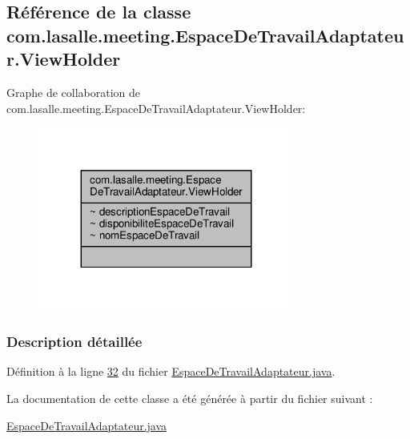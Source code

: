 \hypertarget{classcom_1_1lasalle_1_1meeting_1_1_espace_de_travail_adaptateur_1_1_view_holder}{}\subsection{Référence de la classe com.\+lasalle.\+meeting.\+Espace\+De\+Travail\+Adaptateur.\+View\+Holder}
\label{classcom_1_1lasalle_1_1meeting_1_1_espace_de_travail_adaptateur_1_1_view_holder}


Graphe de collaboration de com.\+lasalle.\+meeting.\+Espace\+De\+Travail\+Adaptateur.\+View\+Holder\+:\nopagebreak
\begin{figure}[H]
\begin{center}
\leavevmode
\includegraphics[width=239pt]{classcom_1_1lasalle_1_1meeting_1_1_espace_de_travail_adaptateur_1_1_view_holder__coll__graph}
\end{center}
\end{figure}


\subsubsection{Description détaillée}


Définition à la ligne \hyperlink{_espace_de_travail_adaptateur_8java_source_l00032}{32} du fichier \hyperlink{_espace_de_travail_adaptateur_8java_source}{Espace\+De\+Travail\+Adaptateur.\+java}.



La documentation de cette classe a été générée à partir du fichier suivant \+:\begin{DoxyCompactItemize}
\item 
\hyperlink{_espace_de_travail_adaptateur_8java}{Espace\+De\+Travail\+Adaptateur.\+java}\end{DoxyCompactItemize}
